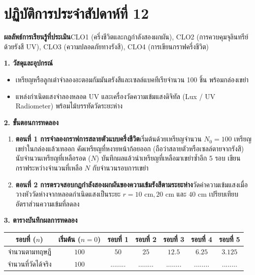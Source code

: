 \section{ปฏิบัติการประจำสัปดาห์ที่ 12}

\begin{labbox}
\noindent\textbf{ผลลัพธ์การเรียนรู้ที่ประเมิน}\quad CLO1 (ครึ่งชีวิตและกฎกำลังสองผกผัน), CLO2 (การควบคุมจุลินทรีย์ด้วยรังสี UV), CLO3 (ความปลอดภัยทางรังสี), CLO4 (การเขียนกราฟครึ่งชีวิต)

\vspace{4pt}
\noindent\textbf{1. วัสดุและอุปกรณ์}
\begin{itemize}
    \item เหรียญหรือลูกเต๋าจำลองอะตอมกัมมันตรังสีและเซลล์แบคทีเรียจำนวน 100 ชิ้น พร้อมกล่องเขย่า
    \item แหล่งกำเนิดแสงจำลองหลอด UV และเครื่องวัดความเข้มแสงดิจิทัล (Lux / UV Radiometer) พร้อมไม้บรรทัดวัดระยะห่าง
\end{itemize}

\noindent\textbf{2. ขั้นตอนการทดลอง}
\begin{enumerate}
    \item \textbf{ตอนที่ 1 การจำลองกราฟการสลายตัวแบบครึ่งชีวิต}\quad เริ่มต้นด้วยเหรียญจำนวน $N_0 = 100$ เหรียญ เขย่าในกล่องแล้วเทออก คัดเหรียญที่หงายหน้าก้อยออก (ถือว่าสลายตัวหรือเซลล์ตายจากรังสี) นับจำนวนเหรียญที่เหลือรอด ($N$) บันทึกผลแล้วนำเหรียญที่เหลือมาเขย่าซ้ำอีก 5 รอบ เขียนกราฟระหว่างจำนวนที่เหลือ $N$ กับจำนวนรอบการเขย่า
    \item \textbf{ตอนที่ 2 การตรวจสอบกฎกำลังสองผกผันของความเข้มรังสีตามระยะห่าง}\quad วัดค่าความเข้มแสงเมื่อวางหัววัดห่างจากหลอดกำเนิดแสงเป็นระยะ $r = 10\text{ cm}, 20\text{ cm}$ และ $40\text{ cm}$ เปรียบเทียบอัตราส่วนความเข้มที่ลดลง
\end{enumerate}

\noindent\textbf{3. ตารางบันทึกผลการทดลอง}
\begin{center}
\footnotesize\setlength{\tabcolsep}{3.5pt}
\begin{tabularx}{\linewidth}{c c c c c c c}
\toprule
\textbf{รอบที่ ($n$)} & \textbf{เริ่มต้น ($n=0$)} & \textbf{รอบที่ 1} & \textbf{รอบที่ 2} & \textbf{รอบที่ 3} & \textbf{รอบที่ 4} & \textbf{รอบที่ 5} \\
\midrule
จำนวนตามทฤษฎี & $100$ & $50$ & $25$ & $12.5$ & $6.25$ & $3.125$ \\
จำนวนที่วัดได้จริง & $100$ & ........ & ........ & ........ & ........ & ........ \\
\bottomrule
\end{tabularx}
\end{center}
\end{labbox}

